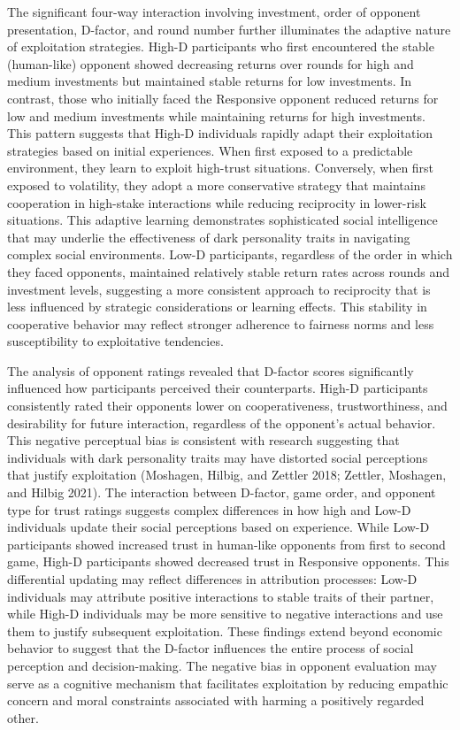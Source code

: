 \documentclass[
]{article}
\begin{document}
The significant four-way interaction involving investment, order of opponent presentation, D-factor, and round number further illuminates the adaptive nature of exploitation strategies. High-D participants who first encountered the stable (human-like) opponent showed decreasing returns over rounds for high and medium investments but maintained stable returns for low investments. In contrast, those who initially faced the Responsive opponent reduced returns for low and medium investments while maintaining returns for high investments.
This pattern suggests that High-D individuals rapidly adapt their exploitation strategies based on initial experiences. When first exposed to a predictable environment, they learn to exploit high-trust situations. Conversely, when first exposed to volatility, they adopt a more conservative strategy that maintains cooperation in high-stake interactions while reducing reciprocity in lower-risk situations. This adaptive learning demonstrates sophisticated social intelligence that may underlie the effectiveness of dark personality traits in navigating complex social environments.
Low-D participants, regardless of the order in which they faced opponents, maintained relatively stable return rates across rounds and investment levels, suggesting a more consistent approach to reciprocity that is less influenced by strategic considerations or learning effects. This stability in cooperative behavior may reflect stronger adherence to fairness norms and less susceptibility to exploitative tendencies.

The analysis of opponent ratings revealed that D-factor scores significantly influenced how participants perceived their counterparts. High-D participants consistently rated their opponents lower on cooperativeness, trustworthiness, and desirability for future interaction, regardless of the opponent's actual behavior. This negative perceptual bias is consistent with research suggesting that individuals with dark personality traits may have distorted social perceptions that justify exploitation (Moshagen, Hilbig, and Zettler 2018; Zettler, Moshagen, and Hilbig 2021).
The interaction between D-factor, game order, and opponent type for trust ratings suggests complex differences in how high and Low-D individuals update their social perceptions based on experience. While Low-D participants showed increased trust in human-like opponents from first to second game, High-D participants showed decreased trust in Responsive opponents. This differential updating may reflect differences in attribution processes: Low-D individuals may attribute positive interactions to stable traits of their partner, while High-D individuals may be more sensitive to negative interactions and use them to justify subsequent exploitation.
These findings extend beyond economic behavior to suggest that the D-factor influences the entire process of social perception and decision-making. The negative bias in opponent evaluation may serve as a cognitive mechanism that facilitates exploitation by reducing empathic concern and moral constraints associated with harming a positively regarded other.
\end{document}
